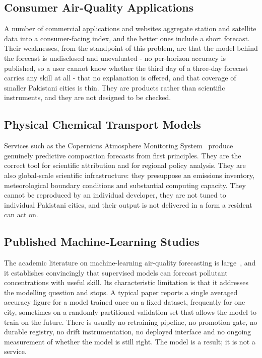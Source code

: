 \subsection{Consumer Air-Quality Applications}
A number of commercial applications and websites aggregate station and satellite
data into a consumer-facing index, and the better ones include a short forecast.
Their weaknesses, from the standpoint of this problem, are that the model behind
the forecast is undisclosed and unevaluated - no per-horizon accuracy is
published, so a user cannot know whether the third day of a three-day forecast
carries any skill at all - that no explanation is offered, and that coverage of
smaller Pakistani cities is thin. They are products rather than
scientific instruments, and they are not designed to be checked.

\subsection{Physical Chemical Transport Models}
Services such as the Copernicus Atmosphere Monitoring System~\cite{ref:cams}
produce genuinely predictive composition forecasts from first principles. They
are the correct tool for scientific attribution and for regional policy analysis.
They are also global-scale scientific infrastructure: they presuppose an
emissions inventory, meteorological boundary conditions and substantial computing
capacity. They cannot be reproduced by an individual developer, they are not
tuned to individual Pakistani cities, and their output is not delivered in a form
a resident can act on.

\subsection{Published Machine-Learning Studies}
The academic literature on machine-learning air-quality forecasting is
large~\cite{ref:raq,ref:xgbpm,ref:lstmpm}, and it establishes convincingly that
supervised models can forecast pollutant concentrations with useful skill. Its
characteristic limitation is that it addresses the modelling question and stops.
A typical paper reports a single averaged accuracy figure for a model trained
once on a fixed dataset, frequently for one city, sometimes on a randomly
partitioned validation set that allows the model to train on the future. There is
usually no retraining pipeline, no promotion gate, no durable registry, no drift
instrumentation, no deployed interface and no ongoing measurement of whether the
model is still right. The model is a result; it is not a service.

